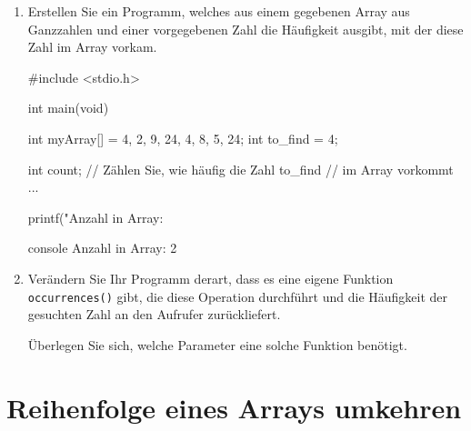 \begin{enumerate}
  \item Erstellen Sie ein Programm, welches aus einem gegebenen Array aus
  Ganzzahlen und einer vorgegebenen Zahl die Häufigkeit ausgibt, mit der diese
  Zahl im Array vorkam.

\Vorlage
\begin{codebox}[lang=c, fontsize=\small]
#include <stdio.h>

int main(void) {
    int myArray[] = {4, 2, 9, 24, 4, 8, 5, 24};
    int to_find = 4;

    int count;
    // Zählen Sie, wie häufig die Zahl to_find
    // im Array vorkommt ...

    printf("Anzahl in Array: %
}
\end{codebox}

\begin{mybox}[Bildschirmausgabe]{console}
Anzahl in Array: 2
\end{mybox}

  \item Verändern Sie Ihr Programm derart, dass es eine eigene Funktion
  \texttt{occurrences()} gibt, die diese Operation durchführt und die
  Häufigkeit der gesuchten Zahl an den Aufrufer zurückliefert.

  Überlegen Sie sich, welche Parameter eine solche Funktion benötigt.

\end{enumerate}



\chapter{Reihenfolge eines Arrays umkehren}


